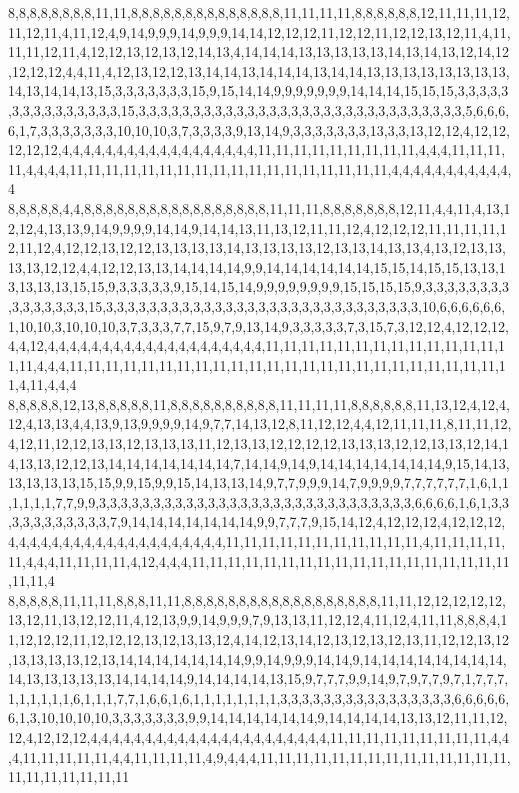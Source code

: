 8,8,8,8,8,8,8,8,11,11,8,8,8,8,8,8,8,8,8,8,8,8,8,8,11,11,11,11,8,8,8,8,8,8,12,11,11,11,12,11,12,11,4,11,12,4,9,14,9,9,9,14,9,9,9,14,14,12,12,12,11,12,12,11,12,12,13,12,11,4,11,11,11,12,11,4,12,12,13,12,13,12,14,13,4,14,14,14,13,13,13,13,13,14,13,14,13,12,14,12,12,12,12,4,4,11,4,12,13,12,12,13,14,14,13,14,14,14,13,14,14,13,13,13,13,13,13,13,13,14,13,14,14,13,15,3,3,3,3,3,3,3,15,9,15,14,14,9,9,9,9,9,9,9,14,14,14,15,15,15,3,3,3,3,3,3,3,3,3,3,3,3,3,3,3,15,3,3,3,3,3,3,3,3,3,3,3,3,3,3,3,3,3,3,3,3,3,3,3,3,3,3,3,3,3,3,5,6,6,6,6,1,7,3,3,3,3,3,3,3,10,10,10,3,7,3,3,3,3,9,13,14,9,3,3,3,3,3,3,3,13,3,3,13,12,12,4,12,12,12,12,12,4,4,4,4,4,4,4,4,4,4,4,4,4,4,4,4,4,4,11,11,11,11,11,11,11,11,11,4,4,4,11,11,11,11,4,4,4,4,11,11,11,11,11,11,11,11,11,11,11,11,11,11,11,11,11,11,4,4,4,4,4,4,4,4,4,4,4,4
8,8,8,8,8,4,4,8,8,8,8,8,8,8,8,8,8,8,8,8,8,8,8,8,11,11,11,8,8,8,8,8,8,8,12,11,4,4,11,4,13,12,12,4,13,13,9,14,9,9,9,9,14,14,9,14,14,13,11,13,12,11,11,12,4,12,12,12,11,11,11,11,12,11,12,4,12,12,13,12,12,13,13,13,13,14,13,13,13,13,12,13,13,14,13,13,4,13,12,13,13,13,13,12,12,4,4,12,12,13,13,14,14,14,14,9,9,14,14,14,14,14,14,15,15,14,15,15,13,13,13,13,13,13,15,15,9,3,3,3,3,3,9,15,14,15,14,9,9,9,9,9,9,9,9,15,15,15,15,9,3,3,3,3,3,3,3,3,3,3,3,3,3,3,3,15,3,3,3,3,3,3,3,3,3,3,3,3,3,3,3,3,3,3,3,3,3,3,3,3,3,3,3,3,3,10,6,6,6,6,6,6,1,10,10,3,10,10,10,3,7,3,3,3,7,7,15,9,7,9,13,14,9,3,3,3,3,3,7,3,15,7,3,12,12,4,12,12,12,4,4,12,4,4,4,4,4,4,4,4,4,4,4,4,4,4,4,4,4,4,4,4,11,11,11,11,11,11,11,11,11,11,11,11,11,11,11,4,4,4,11,11,11,11,11,11,11,11,11,11,11,11,11,11,11,11,11,11,11,11,11,11,11,11,11,4,11,4,4,4
8,8,8,8,8,12,13,8,8,8,8,8,11,8,8,8,8,8,8,8,8,8,8,11,11,11,11,8,8,8,8,8,8,11,13,12,4,12,4,12,4,13,13,4,4,13,9,13,9,9,9,9,14,9,7,7,14,13,12,8,11,12,12,4,4,12,11,11,11,8,11,11,12,4,12,11,12,12,13,13,12,13,13,13,11,12,13,13,12,12,12,12,13,13,13,12,12,13,13,12,14,14,13,13,12,12,13,14,14,14,14,14,14,14,7,14,14,9,14,9,14,14,14,14,14,14,14,9,15,14,13,13,13,13,13,15,15,9,9,15,9,9,15,14,13,13,14,9,7,7,9,9,9,14,7,9,9,9,9,7,7,7,7,7,7,1,6,1,1,1,1,1,1,7,7,9,9,3,3,3,3,3,3,3,3,3,3,3,3,3,3,3,3,3,3,3,3,3,3,3,3,3,3,3,3,3,6,6,6,6,1,6,1,3,3,3,3,3,3,3,3,3,3,3,7,9,14,14,14,14,14,14,14,9,9,7,7,7,9,15,14,12,4,12,12,12,4,12,12,12,4,4,4,4,4,4,4,4,4,4,4,4,4,4,4,4,4,4,4,4,11,11,11,11,11,11,11,11,11,11,11,4,11,11,11,11,11,4,4,4,11,11,11,11,4,12,4,4,4,11,11,11,11,11,11,11,11,11,11,11,11,11,11,11,11,11,11,11,11,4
8,8,8,8,8,11,11,11,8,8,8,11,11,8,8,8,8,8,8,8,8,8,8,8,8,8,8,8,8,8,8,11,11,12,12,12,12,12,13,12,11,13,12,12,11,4,12,13,9,9,14,9,9,9,7,9,13,13,11,12,12,4,11,12,4,11,11,8,8,8,4,11,12,12,12,11,12,12,12,13,12,13,13,12,4,14,12,13,14,12,13,12,13,12,13,11,12,12,13,12,13,13,13,13,12,13,14,14,14,14,14,14,14,9,9,14,9,9,9,14,14,9,14,14,14,14,14,14,14,14,14,13,13,13,13,13,14,14,14,14,9,14,14,14,14,13,15,9,7,7,7,9,9,14,9,7,9,7,7,9,7,1,7,7,7,1,1,1,1,1,1,6,1,1,1,7,7,1,6,6,1,6,1,1,1,1,1,1,1,1,3,3,3,3,3,3,3,3,3,3,3,3,3,3,3,3,6,6,6,6,6,6,1,3,10,10,10,10,3,3,3,3,3,3,3,9,9,14,14,14,14,14,14,9,14,14,14,14,13,13,12,11,11,12,12,4,12,12,12,4,4,4,4,4,4,4,4,4,4,4,4,4,4,4,4,4,4,4,4,4,4,11,11,11,11,11,11,11,11,11,4,4,4,11,11,11,11,11,4,4,11,11,11,11,4,9,4,4,4,11,11,11,11,11,11,11,11,11,11,11,11,11,11,11,11,11,11,11,11,11
